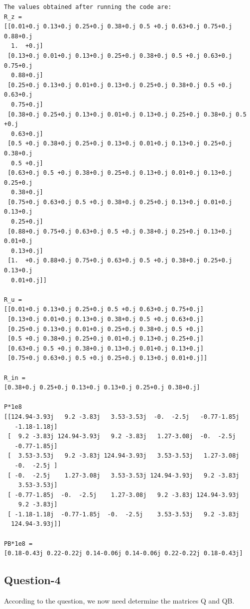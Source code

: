 \documentclass{article}
\begin{document}
\begin{verbatim}
The values obtained after running the code are:
R_z =
[[0.01+0.j 0.13+0.j 0.25+0.j 0.38+0.j 0.5 +0.j 0.63+0.j 0.75+0.j 0.88+0.j
  1.  +0.j]
 [0.13+0.j 0.01+0.j 0.13+0.j 0.25+0.j 0.38+0.j 0.5 +0.j 0.63+0.j 0.75+0.j
  0.88+0.j]
 [0.25+0.j 0.13+0.j 0.01+0.j 0.13+0.j 0.25+0.j 0.38+0.j 0.5 +0.j 0.63+0.j
  0.75+0.j]
 [0.38+0.j 0.25+0.j 0.13+0.j 0.01+0.j 0.13+0.j 0.25+0.j 0.38+0.j 0.5 +0.j
  0.63+0.j]
 [0.5 +0.j 0.38+0.j 0.25+0.j 0.13+0.j 0.01+0.j 0.13+0.j 0.25+0.j 0.38+0.j
  0.5 +0.j]
 [0.63+0.j 0.5 +0.j 0.38+0.j 0.25+0.j 0.13+0.j 0.01+0.j 0.13+0.j 0.25+0.j
  0.38+0.j]
 [0.75+0.j 0.63+0.j 0.5 +0.j 0.38+0.j 0.25+0.j 0.13+0.j 0.01+0.j 0.13+0.j
  0.25+0.j]
 [0.88+0.j 0.75+0.j 0.63+0.j 0.5 +0.j 0.38+0.j 0.25+0.j 0.13+0.j 0.01+0.j
  0.13+0.j]
 [1.  +0.j 0.88+0.j 0.75+0.j 0.63+0.j 0.5 +0.j 0.38+0.j 0.25+0.j 0.13+0.j
  0.01+0.j]]
  
R_u =
[[0.01+0.j 0.13+0.j 0.25+0.j 0.5 +0.j 0.63+0.j 0.75+0.j]
 [0.13+0.j 0.01+0.j 0.13+0.j 0.38+0.j 0.5 +0.j 0.63+0.j]
 [0.25+0.j 0.13+0.j 0.01+0.j 0.25+0.j 0.38+0.j 0.5 +0.j]
 [0.5 +0.j 0.38+0.j 0.25+0.j 0.01+0.j 0.13+0.j 0.25+0.j]
 [0.63+0.j 0.5 +0.j 0.38+0.j 0.13+0.j 0.01+0.j 0.13+0.j]
 [0.75+0.j 0.63+0.j 0.5 +0.j 0.25+0.j 0.13+0.j 0.01+0.j]]
 
R_in =
[0.38+0.j 0.25+0.j 0.13+0.j 0.13+0.j 0.25+0.j 0.38+0.j]

P*1e8
[[124.94-3.93j   9.2 -3.83j   3.53-3.53j  -0.  -2.5j   -0.77-1.85j
   -1.18-1.18j]
 [  9.2 -3.83j 124.94-3.93j   9.2 -3.83j   1.27-3.08j  -0.  -2.5j
   -0.77-1.85j]
 [  3.53-3.53j   9.2 -3.83j 124.94-3.93j   3.53-3.53j   1.27-3.08j
   -0.  -2.5j ]
 [ -0.  -2.5j    1.27-3.08j   3.53-3.53j 124.94-3.93j   9.2 -3.83j
    3.53-3.53j]
 [ -0.77-1.85j  -0.  -2.5j    1.27-3.08j   9.2 -3.83j 124.94-3.93j
    9.2 -3.83j]
 [ -1.18-1.18j  -0.77-1.85j  -0.  -2.5j    3.53-3.53j   9.2 -3.83j
  124.94-3.93j]]
  
PB*1e8 =
[0.18-0.43j 0.22-0.22j 0.14-0.06j 0.14-0.06j 0.22-0.22j 0.18-0.43j]

\end{verbatim}

\subsection{Question-4}
According to the question, we now need determine the matrices Q and QB.
\end{document}
